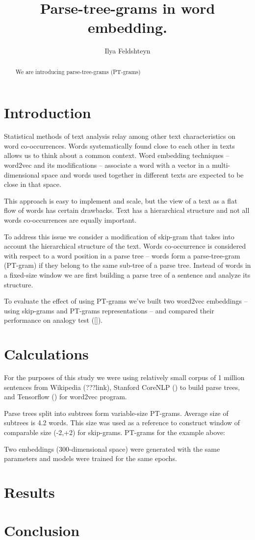 \documentclass[12pt]{article}
\title{Parse-tree-grams in word embedding.}
\author{Ilya Feldshteyn}
\begin{document}
\maketitle

\begin{abstract}
We are introducing parse-tree-grams (PT-grams) 
\end{abstract}


\section{Introduction}

Statistical methods of text analysis relay among other
text characteristics on word co-occurrences.
Words systematically found close to each other in texts
allows us to think about a common context. Word
embedding techniques -- word2vec and its modifications --
associate a word with a vector in a multi-dimensional
space and words used together in different texts are
expected to be close in that space.

This approach is easy to implement and scale,
but the view of a text as a flat flow of words has
certain drawbacks. Text has a hierarchical structure
and not all words co-occurrences are equally important.

To address this issue we consider a modification of
skip-gram that takes into account the hierarchical structure of the
text. Words co-occurrence is considered with respect to a
word position in a parse tree -- words form a parse-tree-gram 
(PT-gram) if they belong to the same sub-tree of a parse tree.
Instead of words in a fixed-size window we are first building
a parse tree of a sentence and analyze its structure.


To evaluate the effect of using PT-grams we've built
two word2vec embeddings -- using skip-grams and PT-grams representations --
and compared their performance on analogy test ([]).

\section{Calculations}

For the purposes of this study we were using relatively small
corpus of 1 million sentences from Wikipedia (???link),
Stanford CoreNLP (\cite{corenlp}) to build parse trees, and
Tensorflow (\cite{tensorflow}) for word2vec program.

Parse trees split into subtrees form variable-size PT-grams.
Average size of subtrees is 4.2 words.
This size was used as a reference to construct
window of comparable size (-2,+2) for skip-grams. 
PT-grams for the example above:


Two embeddings (300-dimensional space)
were generated with the same parameters and models were trained
for the same epochs.

\section{Results}

\section{Conclusion}






\end{document}
